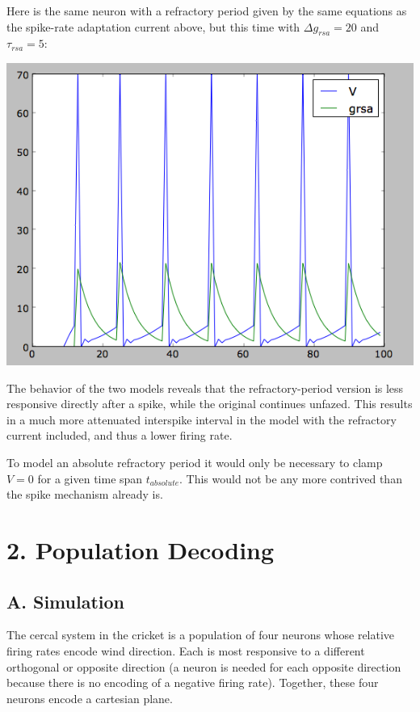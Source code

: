 \documentclass[12pt]{article}
\begin{document}
Here is the same neuron with a refractory period given by the same equations as the spike-rate adaptation current above, but this time with $\Delta g_{rsa}=20$ and $\tau_{rsa}=5$:

\vspace{15pt}
\includegraphics[scale=0.5]{refractory.png}
\vspace{5pt}

The behavior of the two models reveals that the refractory-period version is less responsive directly after a spike, while the original continues unfazed.  This results in a much more attenuated interspike interval in the model with the refractory current included, and thus a lower firing rate.

To model an absolute refractory period it would only be necessary to clamp $V=0$ for a given time span $t_{absolute}$.  This would not be any more contrived than the spike mechanism already is.  

\section{2. Population Decoding}

\subsection{A. Simulation}

The cercal system in the cricket is a population of four neurons whose relative firing rates encode wind direction.  Each is most responsive to a different orthogonal or opposite direction (a neuron is needed for each opposite direction because there is no encoding of a negative firing rate).  Together, these four neurons encode a cartesian plane.  
\end{document}
